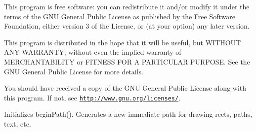 This program is free software\+: you can redistribute it and/or modify it under the terms of the G\+N\+U General Public License as published by the Free Software Foundation, either version 3 of the License, or (at your option) any later version.

This program is distributed in the hope that it will be useful, but W\+I\+T\+H\+O\+U\+T A\+N\+Y W\+A\+R\+R\+A\+N\+T\+Y; without even the implied warranty of M\+E\+R\+C\+H\+A\+N\+T\+A\+B\+I\+L\+I\+T\+Y or F\+I\+T\+N\+E\+S\+S F\+O\+R A P\+A\+R\+T\+I\+C\+U\+L\+A\+R P\+U\+R\+P\+O\+S\+E. See the G\+N\+U General Public License for more details.

You should have received a copy of the G\+N\+U General Public License along with this program. If not, see \href{http://www.gnu.org/licenses/}{\tt http\+://www.\+gnu.\+org/licenses/}.

Initializes begin\+Path(). Generates a new immediate path for drawing rects, paths, text, etc. 